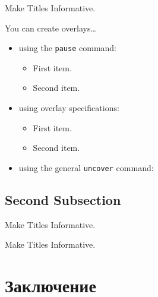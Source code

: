 \documentclass{beamer}
\begin{document}
\begin{frame}{Make Titles Informative.}

  You can create overlays\dots
  \begin{itemize}
    \item using the \texttt{pause} command:
      \begin{itemize}
        \item
          First item.
          \pause
        \item    
          Second item.
      \end{itemize}
    \item
      using overlay specifications:
      \begin{itemize}
        \item<3->
          First item.
        \item<4->
          Second item.
      \end{itemize}
    \item
      using the general \texttt{uncover} command:
      \begin{itemize}
    \end{itemize}
\end{itemize}
\end{frame}


\subsection{Second Subsection}

\begin{frame}{Make Titles Informative.}
\end{frame}

\begin{frame}{Make Titles Informative.}
\end{frame}



\section*{Заключение}
\end{document}
